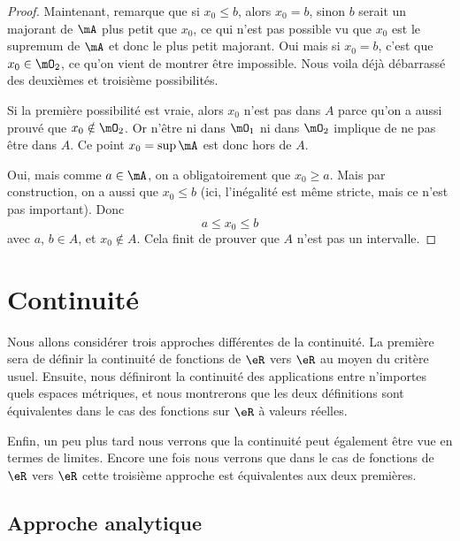 \begin{proof}
	Maintenant, remarque que si $x_0\leq b$, alors $x_0=b$, sinon $b$ serait un majorant de $\mA$ plus petit que $x_0$, ce qui n'est pas possible vu que $x_0$ est le supremum de $\mA$ et donc le plus petit majorant. Oui mais si $x_0=b$, c'est que $x_0\in\mO_2$, ce qu'on vient de montrer être impossible. Nous voila déjà débarrassé des deuxièmes et troisième possibilités. 

	Si la première possibilité est vraie, alors $x_0$ n'est pas dans $A$ parce qu'on a aussi prouvé que $x_0\notin\mO_2$. Or n'être ni dans $\mO_1$ ni dans $\mO_2$ implique de ne pas être dans $A$. Ce point $x_0=\sup\mA$ est donc hors de $A$.

	Oui, mais comme $a\in\mA$, on a obligatoirement que $x_0\geq a$. Mais par construction, on a aussi que $x_0\leq b$ (ici, l'inégalité est même stricte, mais ce n'est pas important). Donc
	\[ 
	  a\leq x_0\leq b
	\]
	avec $a$, $b\in A$, et $x_0\notin A$. Cela finit de prouver que $A$ n'est pas un intervalle.
\end{proof}



\section{Continuité}

Nous allons considérer trois approches différentes de la continuité. La première sera de définir la continuité de fonctions de $\eR$ vers $\eR$ au moyen du critère usuel. Ensuite, nous définiront la continuité des applications entre n'importes quels espaces métriques, et nous montrerons que les deux définitions sont équivalentes dans le cas des fonctions sur $\eR$ à valeurs réelles.

Enfin, un peu plus tard nous verrons que la continuité peut également être vue en termes de limites. Encore une fois nous verrons que dans le cas de fonctions de $\eR$ vers $\eR$ cette troisième approche est équivalentes aux deux premières.

\subsection{Approche analytique}

